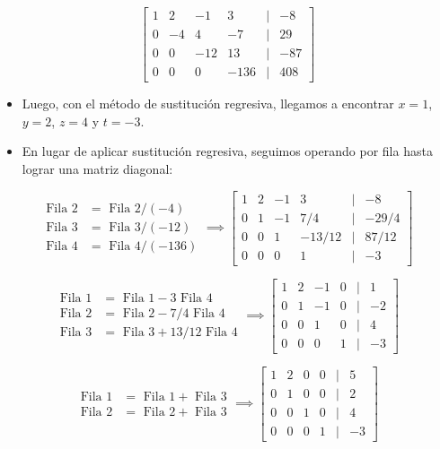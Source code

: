\documentclass[openany]{book}
\providecommand{\tightlist}{%
  \setlength{\itemsep}{0pt}\setlength{\parskip}{0pt}}
\begin{document}
\[
\begin{bmatrix}
1 & 2 & -1 & 3 &|& -8\\
0 & -4 & 4 & -7 &|& 29\\
0 & 0 & -12 & 13 &|& -87\\
0 & 0 & 0 & -136 &|& 408  
\end{bmatrix}
\]

\begin{itemize}
\tightlist
\item
  Luego, con el método de sustitución regresiva, llegamos a encontrar \(x=1\), \(y=2\), \(z=4\) y \(t=-3\).
\item
  En lugar de aplicar sustitución regresiva, seguimos operando por fila hasta lograr una matriz diagonal:
\end{itemize}

\[
\begin{array}{cl}
\text{Fila 2} &= \text{ Fila 2} / (-4) \\ 
\text{Fila 3} &= \text{ Fila 3} /(-12) \\
\text{Fila 4} &= \text{ Fila 4} / (-136) 
\end{array}
\implies
\begin{bmatrix}
1 & 2 & -1 & 3 &|& -8\\
0 & 1 & -1 & 7/4 &|& -29/4\\
0 & 0 & 1 & -13/12 &|& 87/12\\
0 & 0 & 0 & 1 &|& -3  
\end{bmatrix}
\]

\[
\begin{array}{cl}
\text{Fila 1} &= \text{ Fila 1} - 3 \text{ Fila 4} \\ 
\text{Fila 2} &= \text{ Fila 2} - 7/4 \text{ Fila 4}\\
\text{Fila 3} &= \text{ Fila 3} + 13/12 \text{ Fila 4} 
\end{array}
\implies
\begin{bmatrix}
1 & 2 & -1 & 0 &|& 1\\
0 & 1 & -1 & 0 &|& -2\\
0 & 0 & 1 & 0 &|& 4\\
0 & 0 & 0 & 1 &|& -3  
\end{bmatrix}
\]

\[
\begin{array}{cl}
\text{Fila 1} &= \text{ Fila 1} + \text{ Fila 3} \\ 
\text{Fila 2} &= \text{ Fila 2} + \text{ Fila 3}
\end{array}
\implies
\begin{bmatrix}
1 & 2 & 0 & 0 &|& 5\\
0 & 1 & 0 & 0 &|& 2\\
0 & 0 & 1 & 0 &|& 4\\
0 & 0 & 0 & 1 &|& -3  
\end{bmatrix}
\]
\end{document}

